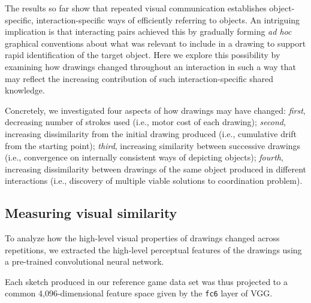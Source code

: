 \documentclass[10pt,letterpaper]{article}
\begin{document}
The results so far show that repeated visual communication establishes object-specific, interaction-specific ways of efficiently referring to objects.
An intriguing implication is that interacting pairs achieved this by gradually forming \textit{ad hoc} graphical conventions about what was relevant to include in a drawing to support rapid identification of the target object. 
Here we explore this possibility by examining how drawings changed throughout an interaction in such a way that may reflect the increasing contribution of such interaction-specific shared knowledge.

Concretely, we investigated four aspects of how drawings may have changed: \textit{first}, decreasing number of strokes used (i.e., motor cost of each drawing); \textit{second}, increasing dissimilarity from the initial drawing produced (i.e., cumulative drift from the starting point); \textit{third}, increasing similarity between successive drawings (i.e., convergence on internally consistent ways of depicting objects); \textit{fourth}, increasing dissimilarity between drawings of the same object produced in different interactions (i.e., discovery of multiple viable solutions to coordination problem). 



\subsection{Measuring visual similarity}



To analyze how the high-level visual properties of drawings changed across repetitions, we extracted the high-level perceptual features of the drawings using a pre-trained convolutional neural network. 

Each sketch produced in our reference game data set was thus projected to a common 4,096-dimensional feature space given by the \texttt{fc6} layer of VGG. 
\end{document}
